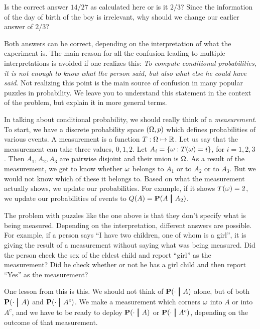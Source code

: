 \documentclass[preprint,  11pt]{amsart}
\begin{document}
Is the correct answer $14/27$ as calculated here or is it $2/3$? Since the  information of the day of birth of the boy is irrelevant, why should we change our earlier answer of $2/3$?

Both answers can be correct, depending on the interpretation of what the experiment is. The  main reason for all the confusion leading to multiple interpretations is avoided if one realizes this: {\em To compute conditional probabilities,  it is not enough to know what the person said, but also what else he could have said}. Not realizing  this point is the main source of confusion in many  popular puzzles in probability.  We leave you to understand this statement in the context of the problem, but explain it in more general terms.

 In talking about conditional probability, we should really think of a {\em measurement}. To start, we have a discrete probability space $(\Omega,p)$ which defines probabilities of various events. A measurement is a function $T:\Omega\mapsto \mathbb{R}$.  Let us say that the measurement can take three values, $0,1,2$. Let $A_i=\{\omega {\; : \;} T(\omega)=i\}$, for $i=1,2,3$. Then $A_1,A_2,A_3$ are pairwise disjoint and their union is $\Omega$. As a result of the measurement, we get to know whether  $\omega$ belongs to $A_1$ or to $A_2$ or to $A_3$. But we would not know which of these it belongs to.  Based on what the measurement actually shows, we update our probabilities. For example, if it shows $T(\omega)=2$, we update our probabilities of events to $Q(A)=\mathbf{P}(A\ \pmb{\big|} \  A_2)$. 

The problem with puzzles like the one above is that they don't specify what is being measured. Depending on the interpretation, different answers are possible. For example, if a person says ``I have two children, one of whom is a girl'', it is giving the result of a measurement without saying what was being measured. Did the person check the sex of the eldest child and report ``girl'' as the measurement? Did he check whether or not he has a girl child and then report ``Yes'' as the measurement?

One lesson from this is this. We should not think of $\mathbf{P}(\cdot \ \pmb{\big|} \  A)$ alone, but of both $\mathbf{P}(\cdot\ \pmb{\big|} \  A)$ and $\mathbf{P}(\cdot \ \pmb{\big|} \  A^c)$. We make a measurement which corners $\omega$ into  $A$ or into $A^c$, and we have to be ready to deploy $\mathbf{P}(\cdot \ \pmb{\big|} \  A)$ or $\mathbf{P}(\cdot \ \pmb{\big|} \  A^c)$, depending on the outcome of that measurement.
\end{document}
